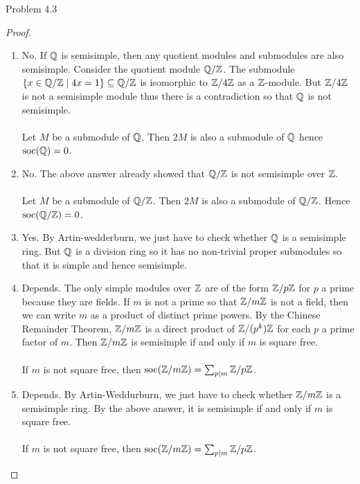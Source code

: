 \documentclass[a4paper]{article}
\begin{document}
\begin{ex}{Problem 4.3}{}
\begin{proof}
\begin{enumerate}
$\text{soc}(\Z^n)=0$. (?)

\item No. If $\mathbb{Q}$ is semisimple, then any quotient modules and submodules are also semisimple. Consider the quotient module $\mathbb{Q}/\mathbb{Z}$. The submodule $\{x\in\mathbb{Q}/\mathbb{Z}\;|\;4x=1\}\subseteq\mathbb{Q}/\mathbb{Z}$ is isomorphic to $\mathbb{Z}/4\mathbb{Z}$ as a $\mathbb{Z}$-module. But $\mathbb{Z}/4\mathbb{Z}$ is not a semisimple module thus there is a contradiction so that $\mathbb{Q}$ is not semisimple. \\~\\

Let $M$ be a submodule of $\mathbb{Q}$. Then $2M$ is also a submodule of $\mathbb{Q}$ hence $\text{soc}(\mathbb{Q})=0$. 
\item No. The above answer already showed that $\mathbb{Q}/\mathbb{Z}$ is not semisimple over $\mathbb{Z}$. \\~\\

Let $M$ be a submodule of $\mathbb{Q}/\mathbb{Z}$. Then $2M$ is also a submodule of $\mathbb{Q}/\mathbb{Z}$. Hence $\text{soc}(\mathbb{Q}/\mathbb{Z})=0$. 

\item Yes. By Artin-wedderburn, we just have to check whether $\mathbb{Q}$ is a semisimple ring. But $\mathbb{Q}$ is a division ring so it has no non-trivial proper submodules so that it is simple and hence semisimple. 

\item Depends. The only simple modules over $\mathbb{Z}$ are of the form $\mathbb{Z}/p\mathbb{Z}$ for $p$ a prime because they are fields. If $m$ is not a prime so that $\mathbb{Z}/m\mathbb{Z}$ is not a field, then we can write $m$ as a product of distinct prime powers. By the Chinese Remainder Theorem, $\mathbb{Z}/m\mathbb{Z}$ is a direct product of $\mathbb{Z}/(p^k)\mathbb{Z}$ for each $p$ a prime factor of $m$. Then $\mathbb{Z}/m\mathbb{Z}$ is semisimple if and only if $m$ is square free. \\~\\

If $m$ is not square free, then $\text{soc}(\mathbb{Z}/m\mathbb{Z})=\sum_{p|m}\mathbb{Z}/p\mathbb{Z}$. 

\item Depends. By Artin-Weddurburn, we just have to check whether $\mathbb{Z}/m\mathbb{Z}$ is a semisimple ring. By the above answer, it is semisimple if and only if $m$ is square free. \\~\\

If $m$ is not square free, then $\text{soc}(\mathbb{Z}/m\mathbb{Z})=\sum_{p|m}\mathbb{Z}/p\mathbb{Z}$. 
\end{enumerate}
\end{proof}
\end{ex}
\end{document}
